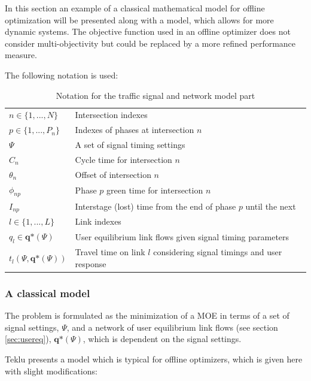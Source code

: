 \label{sec:model}

In this section an example of a classical mathematical model for
offline optimization will be presented along with a model, which
allows for more dynamic systems. The objective function used in an
offline optimizer does not consider multi-objectivity but could be
replaced by a more refined performance measure.

The following notation is used:

\begin{table}[!ht]
\begin{center}
\begin{tabular}{ll}
\hline
$n \in \lbrace 1,...,N \rbrace$ & Intersection indexes \\
$p \in \lbrace 1,...,P_n \rbrace$ & Indexes of phases at intersection $n$ \\ 
$\Psi$ & A set of signal timing settings \\
$C_n$ & Cycle time for intersection $n$ \\
$\theta_n$ & Offset of intersection $n$ \\
$\phi_{np}$ & Phase $p$ green time for intersection $n$  \\
$I_{np}$ & Interstage (lost) time from the end of phase $p$ until the next  \\
\hline
$l \in \lbrace 1,...,L \rbrace$ & Link indexes \\
$q_l \in \textbf{q*}(\Psi)$ & User equilibrium link flows given signal timing parameters  \\
$t_l(\Psi,\textbf{q*}(\Psi))$ & Travel time on link $l$ considering signal timings and user response \\
\hline
\end{tabular}
\end{center}
\caption{Notation for the traffic signal and network model part}
\end{table}

\subsubsection*{A classical model}

The problem is formulated as the minimization of a MOE in terms of a
set of signal settings, $\Psi$, and a network of user equilibrium link
flows (see section \ref{sec:usereq}), $\textbf{q*}(\Psi)$, which is
dependent on the signal settings.

Teklu \cite{2} presents a model which is typical for offline optimizers, which is given here with slight modifications:


